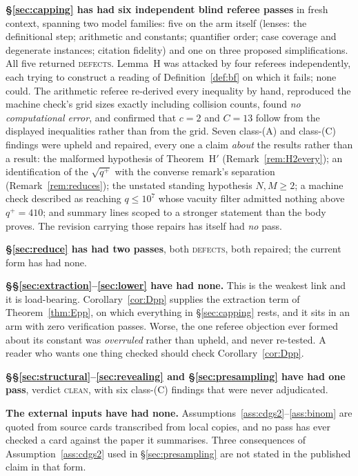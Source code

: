\documentclass{aicr-solution}
\begin{document}
\smallskip
\noindent\textbf{\S\ref{sec:capping} has had six independent blind referee passes}
in fresh context, spanning two model families: five on the arm itself (lenses: the
definitional step; arithmetic and constants; quantifier order; case coverage and
degenerate instances; citation fidelity) and one on three proposed simplifications.
All five returned \textsc{defects}. Lemma~H was attacked by four referees
independently, each trying to construct a reading of Definition~\ref{def:bf} on
which it fails; none could. The arithmetic referee re-derived every inequality by
hand, reproduced the machine check's grid sizes exactly including collision counts,
found \emph{no computational error}, and confirmed that $c = 2$ and $C = 13$ follow
from the displayed inequalities rather than from the grid. Seven class-(A) and
class-(C) findings were upheld and repaired, every one a claim \emph{about} the
results rather than a result: the malformed hypothesis of Theorem~H$'$
(Remark~\ref{rem:H2every}); an identification of the $\sqrt{q^{+}}$ with the
converse remark's separation (Remark~\ref{rem:reduces}); the unstated standing
hypothesis $N,M \ge 2$; a machine check described as reaching $q \le 10^{7}$ whose
vacuity filter admitted nothing above $q^{+} = 410$; and summary lines scoped to a
stronger statement than the body proves. The revision carrying those repairs has
itself had \emph{no} pass.

\smallskip
\noindent\textbf{\S\ref{sec:reduce} has had two passes}, both \textsc{defects},
both repaired; the current form has had none.

\smallskip
\noindent\textbf{\S\S\ref{sec:extraction}--\ref{sec:lower} have had none.} This is
the weakest link and it is load-bearing. Corollary~\ref{cor:Dpp} supplies the
extraction term of Theorem~\ref{thm:Epp}, on which everything in
\S\ref{sec:capping} rests, and it sits in an arm with zero verification passes.
Worse, the one referee objection ever formed about its constant was \emph{overruled}
rather than upheld, and never re-tested. A reader who wants one thing checked
should check Corollary~\ref{cor:Dpp}.

\smallskip
\noindent\textbf{\S\S\ref{sec:structural}--\ref{sec:revealing} and
\S\ref{sec:presampling} have had one pass}, verdict \textsc{clean}, with six
class-(C) findings that were never adjudicated.

\smallskip
\noindent\textbf{The external inputs have had none.}
Assumptions~\ref{ass:cdgs2}--\ref{ass:binom} are quoted from source cards
transcribed from local copies, and no pass has ever checked a card against the
paper it summarises. Three consequences of Assumption~\ref{ass:cdgs2} used in
\S\ref{sec:presampling} are not stated in the published claim in that form.
\end{document}
